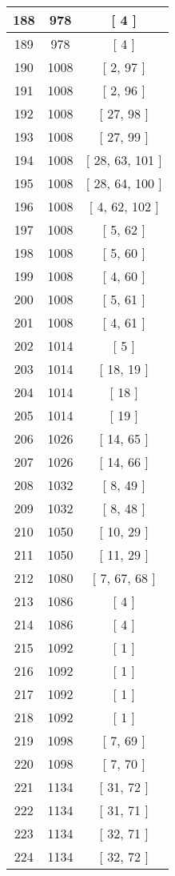 \begin{center}
\begin{longtable}[H]{|| c c c ||}
188 & 978 & [ 4 ]
\\\hline
189 & 978 & [ 4 ]
\\\hline
190 & 1008 & [ 2, 97 ]
\\\hline
191 & 1008 & [ 2, 96 ]
\\\hline
192 & 1008 & [ 27, 98 ]
\\\hline
193 & 1008 & [ 27, 99 ]
\\\hline
194 & 1008 & [ 28, 63, 101 ]
\\\hline
195 & 1008 & [ 28, 64, 100 ]
\\\hline
196 & 1008 & [ 4, 62, 102 ]
\\\hline
197 & 1008 & [ 5, 62 ]
\\\hline
198 & 1008 & [ 5, 60 ]
\\\hline
199 & 1008 & [ 4, 60 ]
\\\hline
200 & 1008 & [ 5, 61 ]
\\\hline
201 & 1008 & [ 4, 61 ]
\\\hline
202 & 1014 & [ 5 ]
\\\hline
203 & 1014 & [ 18, 19 ]
\\\hline
204 & 1014 & [ 18 ]
\\\hline
205 & 1014 & [ 19 ]
\\\hline
206 & 1026 & [ 14, 65 ]
\\\hline
207 & 1026 & [ 14, 66 ]
\\\hline
208 & 1032 & [ 8, 49 ]
\\\hline
209 & 1032 & [ 8, 48 ]
\\\hline
210 & 1050 & [ 10, 29 ]
\\\hline
211 & 1050 & [ 11, 29 ]
\\\hline
212 & 1080 & [ 7, 67, 68 ]
\\\hline
213 & 1086 & [ 4 ]
\\\hline
214 & 1086 & [ 4 ]
\\\hline
215 & 1092 & [ 1 ]
\\\hline
216 & 1092 & [ 1 ]
\\\hline
217 & 1092 & [ 1 ]
\\\hline
218 & 1092 & [ 1 ]
\\\hline
219 & 1098 & [ 7, 69 ]
\\\hline
220 & 1098 & [ 7, 70 ]
\\\hline
221 & 1134 & [ 31, 72 ]
\\\hline
222 & 1134 & [ 31, 71 ]
\\\hline
223 & 1134 & [ 32, 71 ]
\\\hline
224 & 1134 & [ 32, 72 ]

\end{longtable}
\end{center}
